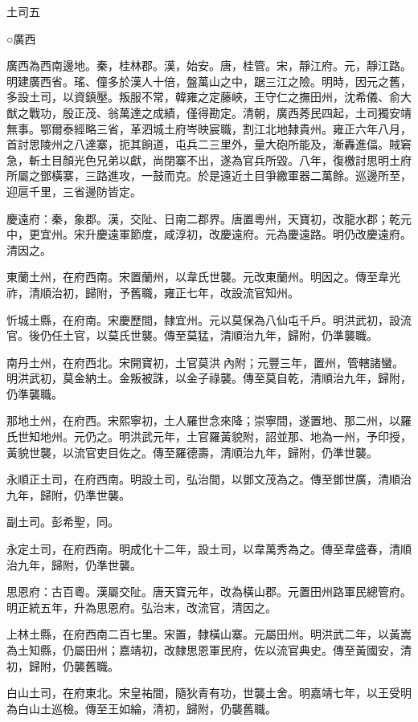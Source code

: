 
\begin{pinyinscope}
土司五

○廣西

廣西為西南邊地。秦，桂林郡。漢，始安。唐，桂管。宋，靜江府。元，靜江路。明建廣西省。瑤、僮多於漢人十倍，盤萬山之中，踞三江之險。明時，因元之舊，多設土司，以資鎮壓。叛服不常，韓雍之定藤峽，王守仁之撫田州，沈希儀、俞大猷之戰功，殷正茂、翁萬達之成績，僅得勘定。清朝，廣西莠民四起，土司獨安靖無事。鄂爾泰經略三省，革泗城土府岑映宸職，割江北地隸貴州。雍正六年八月，首討思陵州之八達寨，扼其餉道，屯兵二三里外，量大砲所能及，漸轟進偪。賊窘急，斬土目顏光色兄弟以獻，尚閉寨不出，遂為官兵所毀。八年，復檄討思明土府所屬之鄧橫寨，三路進攻，一鼓而克。於是遠近土目爭繳軍器二萬餘。巡邊所至，迎扈千里，三省邊防皆定。

慶遠府：秦，象郡。漢，交阯、日南二郡界。唐置粵州，天寶初，改龍水郡；乾元中，更宜州。宋升慶遠軍節度，咸淳初，改慶遠府。元為慶遠路。明仍改慶遠府。清因之。

東蘭土州，在府西南。宋置蘭州，以韋氏世襲。元改東蘭州。明因之。傳至韋光祚，清順治初，歸附，予舊職，雍正七年，改設流官知州。

忻城土縣，在府南。宋慶歷間，隸宜州。元以莫保為八仙屯千戶。明洪武初，設流官。後仍任土官，以莫氏世襲。傳至莫猛，清順治九年，歸附，仍準襲職。

南丹土州，在府西北。宋開寶初，土官莫洪內附；元豐三年，置州，管轄諸蠻。明洪武初，莫金納土。金叛被誅，以金子祿襲。傳至莫自乾，清順治九年，歸附，仍準襲職。

那地土州，在府西。宋熙寧初，土人羅世念來降；崇寧間，遂置地、那二州，以羅氏世知地州。元仍之。明洪武元年，土官羅黃貌附，詔並那、地為一州，予印授，黃貌世襲，以流官吏目佐之。傳至羅德壽，清順治九年，歸附，仍準世襲。

永順正土司，在府西南。明設土司，弘治間，以鄧文茂為之。傳至鄧世廣，清順治九年，歸附，仍準世襲。

副土司。彭希聖，同。

永定土司，在府西南。明成化十二年，設土司，以韋萬秀為之。傳至韋盛春，清順治九年，歸附，仍準世襲。

思恩府：古百粵。漢屬交阯。唐天寶元年，改為橫山郡。元置田州路軍民總管府。明正統五年，升為思恩府。弘治末，改流官，清因之。

上林土縣，在府西南二百七里。宋置，隸橫山寨。元屬田州。明洪武二年，以黃嵩為土知縣，仍屬田州；嘉靖初，改隸思恩軍民府，佐以流官典史。傳至黃國安，清初，歸附，仍襲舊職。

白山土司，在府東北。宋皇祐間，隨狄青有功，世襲土舍。明嘉靖七年，以王受明為白山土巡檢。傳至王如綸，清初，歸附，仍襲舊職。


\end{pinyinscope}
